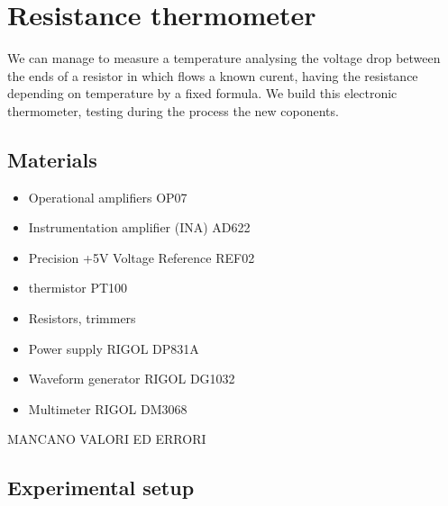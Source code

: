 \chapter{Resistance thermometer}
We can manage to measure a temperature analysing the voltage drop between the ends of a resistor in which flows a known curent, having the resistance depending on temperature by a fixed formula.
We build this electronic thermometer, testing during the process the new coponents.

\section{Materials}
\begin{itemize}
\item Operational amplifiers OP07
\item Instrumentation amplifier (INA) AD622
\item Precision +5V Voltage Reference REF02
\item thermistor PT100
\item Resistors, trimmers
\item Power supply RIGOL DP831A
\item Waveform generator RIGOL DG1032
\item Multimeter RIGOL DM3068
\end{itemize}
MANCANO VALORI ED ERRORI 

\section{Experimental setup}

